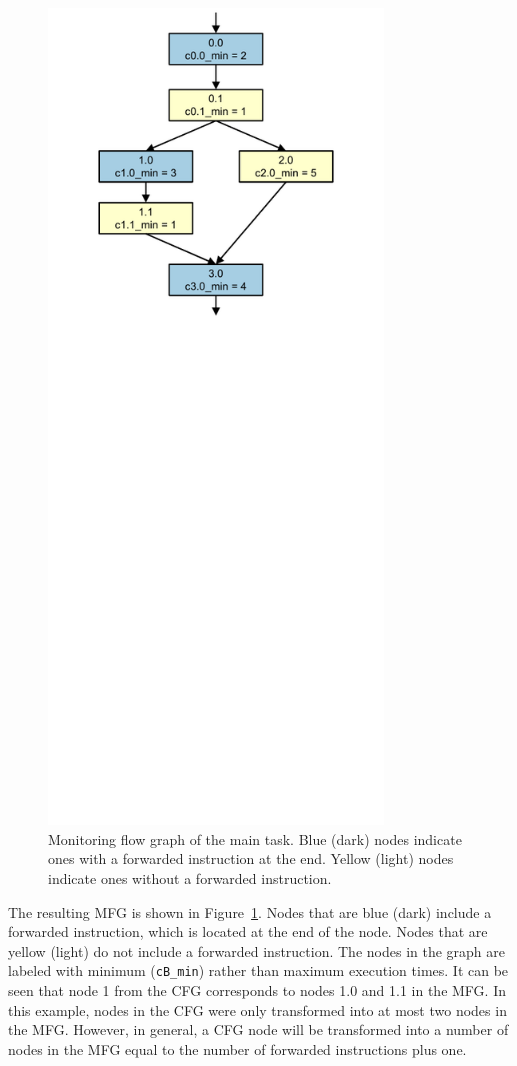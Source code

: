 \begin{figure}
  \begin{center}
    \includegraphics[width=3.5in]{monitoring_wcet/figs/mfg.pdf}
    \caption{Monitoring flow graph of the main task. Blue (dark) nodes indicate
    ones with a forwarded instruction at the end. Yellow (light) nodes indicate
    ones without a forwarded instruction.}
    \label{fig:monitoring_wcet.example.mfg}
  \end{center}
\end{figure}

The resulting MFG is shown in Figure~\ref{fig:monitoring_wcet.example.mfg}.
Nodes that are blue (dark) include a forwarded instruction, which is located at
the end of the node. Nodes that are yellow (light) do not include a forwarded
instruction. The nodes in the graph are labeled with minimum ({\tt cB\_min})
rather than maximum execution times. It can be seen that node 1 from the CFG
corresponds to nodes 1.0 and 1.1 in the MFG. In this example, nodes in the CFG
were only transformed into at most two nodes in the MFG.  However, in general,
a CFG node will be transformed into a number of nodes in the MFG equal to the
number of forwarded instructions plus one.


